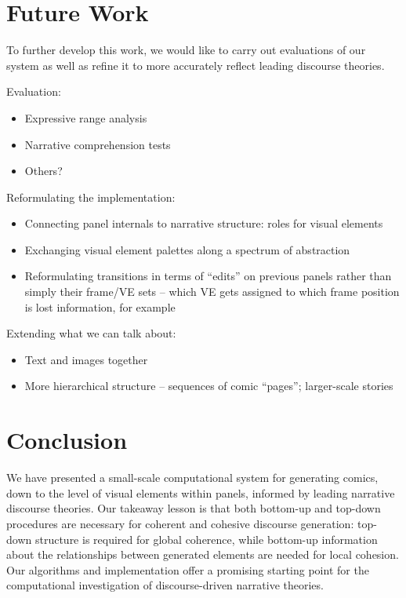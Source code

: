 \section{Future Work}

To further develop this work, we would like to carry out evaluations of our
system as well as refine it to more accurately reflect leading discourse
theories.

Evaluation:
\begin{itemize}
\item Expressive range analysis
\item Narrative comprehension tests
\item Others?
\end{itemize}

Reformulating the implementation:

\begin{itemize}
\item Connecting panel internals to narrative structure: roles for visual
elements
\item Exchanging visual element palettes along a spectrum of abstraction
\item Reformulating transitions in terms of ``edits'' on previous panels
rather than simply their frame/VE sets -- which VE gets assigned to which
frame position is lost information, for example
\end{itemize}

Extending what we can talk about:
\begin{itemize}
\item Text and images together
\item More hierarchical structure -- sequences of comic ``pages'';
larger-scale stories
\end{itemize}


\section{Conclusion}

We have presented a small-scale computational system for generating comics,
down to the level of visual elements within panels, informed by leading
narrative discourse theories.
Our takeaway lesson is that both bottom-up and top-down procedures are
necessary for coherent and cohesive discourse generation: top-down
structure is required for global coherence, while bottom-up information
about the relationships between generated elements are needed for local
cohesion. Our algorithms and implementation offer a promising starting
point for the computational investigation of discourse-driven narrative
theories.



